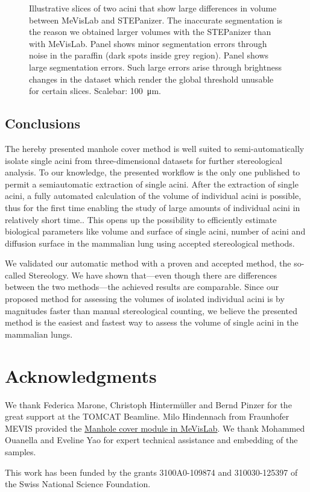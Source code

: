\documentclass[twoside,paper=a4,abstract=true,english,DIVcalc]{scrartcl}
\begin{document}
\begin{figure}
{		\label{subfig:60e_acinus38}%
	}%
	\hfill%
	\caption{Illustrative slices of two acini that show large differences in volume between MeVisLab and STEPanizer. The inaccurate segmentation is the reason we obtained larger volumes with the STEPanizer than with MeVisLab. Panel \protect{} shows minor segmentation errors through noise in the paraffin (dark spots inside grey region). Panel \protect{} shows large segmentation errors. Such large errors arise through brightness changes in the dataset which render the global threshold unusable for certain slices. Scalebar: \SI{100}{\micro\meter}.}
	\label{fig:MeVisSegmentation}
\end{figure}

\subsection{Conclusions}
The hereby presented manhole cover method is well suited to semi-automatically isolate single acini from three-dimensional datasets for further stereological analysis. To our knowledge, the presented workflow is the only one published to permit a semiautomatic extraction of single acini. After the extraction of single acini, a fully automated calculation of the volume of individual acini is possible, thus for the first time enabling the study of large amounts of individual acini in relatively short time.. This opens up the possibility to efficiently estimate biological parameters like volume and surface of single acini, number of acini and diffusion surface in the mammalian lung using accepted stereological methods.

We validated our automatic method with a proven and accepted method, the so-called Stereology. We have shown that---even though there are differences between the two methods---the achieved results are comparable. Since our proposed method for assessing the volumes of isolated individual acini is by magnitudes faster than manual stereological counting, we believe the presented method is the easiest and fastest way to assess the volume of single acini in the mammalian lungs.

\clearpage
\section{Acknowledgments}
We thank Federica Marone, Christoph Hintermüller and Bernd Pinzer for the great support at the TOMCAT Beamline. Milo Hindennach from Fraunhofer MEVIS provided the \href{http://www.mevis-research.de/cgi-bin/discus/board-auth.cgi?lm=1282233250&file=/839/11760.html}{Manhole cover module in MeVisLab}. We thank Mohammed Ouanella and Eveline Yao for expert technical assistance and embedding of the samples.

This work has been funded by the grants 3100A0-109874 and 310030-125397 of the Swiss National Science Foundation.

\clearpage
\singlespacing


\end{document}
